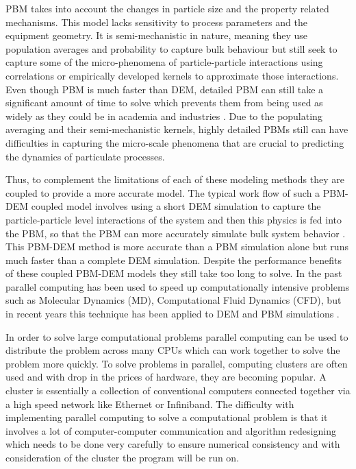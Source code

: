 \documentclass[preprint,11pt,authoryear]{elsarticle}
\begin{document}
PBM takes into account the changes in particle size and the property related mechanisms. This 
model lacks sensitivity to process parameters and the equipment geometry. It is semi-mechanistic in 
nature, meaning they use population averages and probability to capture bulk behaviour but still 
seek to capture some of the micro-phenomena of particle-particle interactions using correlations or 
empirically developed kernels to approximate those interactions. Even though PBM is much faster 
than DEM, detailed PBM can still take a significant amount of time to solve which prevents them 
from being used as widely as they could be in academia and industries \citep{Barrasso2013}. Due to the 
populating averaging and their semi-mechanistic kernels, highly detailed PBMs still can have 
difficulties in capturing the micro-scale phenomena that are crucial to predicting the dynamics of 
particulate processes. 

Thus, to complement the limitations of each of these modeling methods they are coupled to 
provide a more accurate model.  The typical work flow of such a PBM-DEM coupled model involves 
using a short DEM simulation to capture the particle-particle level interactions of the system and 
then this physics is fed into the PBM, so that the PBM can more accurately simulate bulk system 
behavior \citep{Goldschmidt2003} \citep{Reinhold2012}\citep{Barrasso2013}. This PBM-DEM 
method is more accurate than a PBM simulation alone but runs much faster than a complete DEM 
simulation. Despite the performance benefits of these coupled PBM-DEM models they still take too 
long to solve. In the past parallel computing has been used to speed up computationally intensive 
problems such as Molecular Dynamics (MD), Computational Fluid Dynamics (CFD), but in recent 
years  this technique has been applied to DEM and PBM simulations 
\citep{Bettencourt2017}\citep{Prakash2013a}\citep{Gunawan2008}.

In order to solve large computational problems parallel computing can be used to distribute the 
problem across many CPUs which can work together to solve the problem more quickly. To solve 
problems in parallel, computing clusters are often used and with drop  in the prices of hardware, 
they are becoming popular. A cluster is essentially a collection of conventional computers 
connected together via a high speed network like Ethernet or Infiniband. The difficulty with 
implementing parallel computing to solve a computational problem is that it involves a lot of 
computer-computer communication and algorithm redesigning which needs to be done very 
carefully to ensure numerical consistency and with consideration of the cluster the program will be 
run on.
\end{document}
